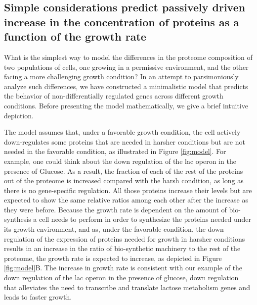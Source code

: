 \subsection{Simple considerations predict passively driven increase in the concentration of proteins as a function of the growth rate}
What is the simplest way to model the differences in the proteome composition of two populations of cells, one growing in a permissive environment, and the other facing a more challenging growth condition?
In an attempt to parsimoniously analyze such differences, we have constructed a minimalistic model that predicts the behavior of non-differentially regulated genes across different growth conditions.
Before presenting the model mathematically, we give a brief intuitive depiction.

The model assumes that, under a favorable growth condition, the cell actively down-regulates some proteins that are needed in harsher conditions but are not needed in the favorable condition, as illustrated in Figure \ref{fig:model}.
For example, one could think about the down regulation of the lac operon in the presence of Glucose. 
As a result, the fraction of each of the rest of the proteins out of the proteome is increased compared with the harsh condition, as long as there is no gene-specific regulation.
All those proteins increase their levels but are expected to show the same relative ratios among each other after the increase as they were before. 
Because the growth rate is dependent on the amount of bio-synthesis a cell needs to perform in order to synthesize the proteins needed under its growth environment, and as, under the favorable condition, the down regulation of the expression of proteins needed for growth in harsher conditions results in an increase in the ratio of bio-synthetic machinery to the rest of the proteome, the growth rate is expected to increase, as  depicted in Figure \ref{fig:model}B.
The increase in growth rate is consistent with our example of the down regulation of the lac operon in the presence of glucose, down regulation that alleviates the need to transcribe and translate lactose metabolism genes and leads to faster growth.